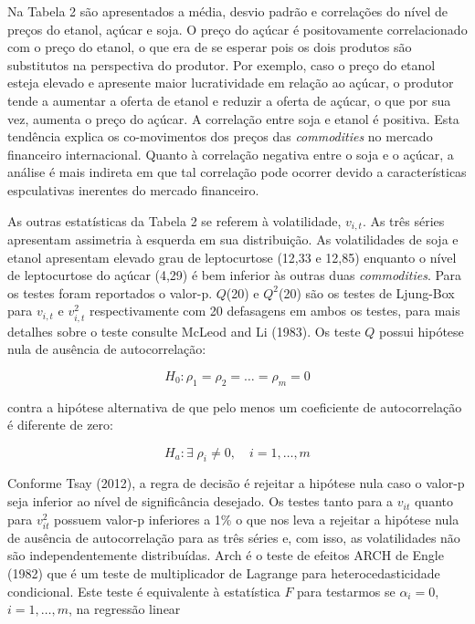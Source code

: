 Na Tabela 2 são apresentados a média, desvio padrão e correlações do
nível de preços do etanol, açúcar e soja. O preço do açúcar é
positovamente correlacionado com o preço do etanol, o que era de se
esperar pois os dois produtos são substitutos na perspectiva do
produtor. Por exemplo, caso o preço do etanol esteja elevado e apresente
maior lucratividade em relação ao açúcar, o produtor tende a aumentar a
oferta de etanol e reduzir a oferta de açúcar, o que por sua vez,
aumenta o preço do açúcar. A correlação entre soja e etanol é positiva.
Esta tendência explica os co-movimentos dos preços das
\emph{commodities} no mercado financeiro internacional. Quanto à
correlação negativa entre o soja e o açúcar, a análise é mais indireta
em que tal correlação pode ocorrer devido a características espculativas
inerentes do mercado financeiro.

As outras estatísticas da Tabela 2 se referem à volatilidade,
\(v_{i,t}\). As três séries apresentam assimetria à esquerda em sua
distribuição. As volatilidades de soja e etanol apresentam elevado grau
de leptocurtose (12,33 e 12,85) enquanto o nível de leptocurtose do
açúcar (4,29) é bem inferior às outras duas \emph{commodities}. Para os
testes foram reportados o valor-p. \(Q\)(20) e \(Q^2\)(20) são os testes
de Ljung-Box para \(v_{i,t}\) e \(v_{i,t}^2\) respectivamente com 20
defasagens em ambos os testes, para mais detalhes sobre o teste consulte
McLeod and Li (1983). Os teste \(Q\) possui hipótese nula de ausência de
autocorrelação:

\begin{equation}
 H_0: \rho_1=\rho_2=\ldots=\rho_m=0
 \end{equation}

contra a hipótese alternativa de que pelo menos um coeficiente de
autocorrelação é diferente de zero:

\begin{equation}
H_a:\exists \;\rho_i\neq 0, \quad i =1,\ldots,m
\end{equation}

Conforme Tsay (2012), a regra de decisão é rejeitar a hipótese nula caso
o valor-p seja inferior ao nível de significância desejado. Os testes
tanto para a \(v_{it}\) quanto para \(v_{it}^2\) possuem valor-p
inferiores a 1\% o que nos leva a rejeitar a hipótese nula de ausência
de autocorrelação para as três séries e, com isso, as volatilidades não
são independentemente distribuídas. Arch é o teste de efeitos ARCH de
Engle (1982) que é um teste de multiplicador de Lagrange para
heterocedasticidade condicional. Este teste é equivalente à estatística
\(F\) para testarmos se \(\alpha_i=0\), \(i=1,\ldots,m\), na regressão
linear

